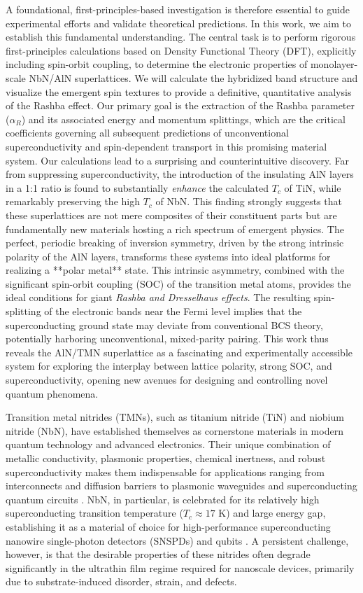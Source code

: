 \documentclass[aps,prl,reprint,superscriptaddress]{revtex4-2}
\begin{document}
A foundational, first-principles-based investigation is therefore
essential to guide experimental efforts and validate theoretical predictions.
In this work, we aim to establish this fundamental understanding. 
The central task is to perform rigorous first-principles calculations based on Density
Functional Theory (DFT), explicitly including spin-orbit coupling, to determine
the electronic properties of monolayer-scale NbN/AlN superlattices. We will
calculate the hybridized band structure and visualize the emergent spin
textures to provide a definitive, quantitative analysis of the Rashba effect.
Our primary goal is the extraction of the Rashba parameter ($\alpha_R$) and its
associated energy and momentum splittings, which are the critical coefficients
governing all subsequent predictions of unconventional superconductivity and
spin-dependent transport in this promising material system.  Our calculations
lead to a surprising and counterintuitive discovery. Far from suppressing
superconductivity, the introduction of the insulating AlN layers in a 1:1 ratio
is found to substantially \textit{enhance} the calculated $T_c$ of TiN, while
remarkably preserving the high $T_c$ of NbN. This finding strongly suggests
that these superlattices are not mere composites of their constituent parts but
are fundamentally new materials hosting a rich spectrum of emergent physics.
The perfect, periodic breaking of inversion symmetry, driven by the strong
intrinsic polarity of the AlN layers, transforms these systems into ideal
platforms for realizing a **polar metal** state. This intrinsic asymmetry,
combined with the significant spin-orbit coupling (SOC) of the transition metal
atoms, provides the ideal conditions for giant \emph{Rashba and Dresselhaus
effects}. The resulting spin-splitting of the electronic bands near the Fermi
level implies that the superconducting ground state may deviate from
conventional BCS theory, potentially harboring unconventional, mixed-parity
pairing. This work thus reveals the AlN/TMN superlattice as a fascinating and
experimentally accessible system for exploring the interplay between lattice
polarity, strong SOC, and superconductivity, opening new avenues for designing
and controlling novel quantum phenomena.

Transition metal nitrides (TMNs), such as titanium nitride (TiN) and niobium
nitride (NbN), have established themselves as cornerstone materials in modern
quantum technology and advanced electronics. Their unique combination of
metallic conductivity, plasmonic properties, chemical inertness, and robust
superconductivity makes them indispensable for applications ranging from
interconnects and diffusion barriers to plasmonic waveguides and
superconducting quantum circuits \cite{shalaev_plasmonics_2007}. NbN, in
particular, is celebrated for its relatively high superconducting transition
temperature ($T_c \approx 17$ K) and large energy gap, establishing it as a
material of choice for high-performance superconducting nanowire single-photon
detectors (SNSPDs) and qubits \cite{verma_superconducting_2021}. A persistent
challenge, however, is that the desirable properties of these nitrides often
degrade significantly in the ultrathin film regime required for nanoscale
devices, primarily due to substrate-induced disorder, strain, and defects.
\end{document}
